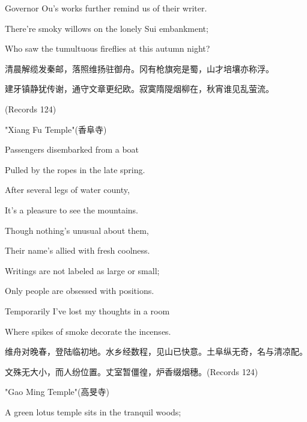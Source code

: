 \begin{BookQuote}
Governor Ou's works further remind us of their writer.
\end{BookQuote}

\begin{BookQuote}
There're smoky willows on the lonely Sui embankment;
\end{BookQuote}

\begin{BookQuote}
Who saw the tumultuous fireflies at this autumn night?
\end{BookQuote}

\begin{BookQuote}
清晨解缆发秦邮，落照维扬驻御舟。冈有枪旗宛是蜀，山才培壤亦称浮。
\end{BookQuote}

\begin{BookQuote}
建牙镇静犹传谢，通守文章更纪欧。寂寞隋隄烟柳在，秋宵谁见乱萤流。
\end{BookQuote}

(Records 124)

"Xiang Fu Temple"(香阜寺)

\begin{BookQuote}
Passengers disembarked from a boat
\end{BookQuote}

\begin{BookQuote}
Pulled by the ropes in the late spring.
\end{BookQuote}


\noindent After several legs of water county,

It's a pleasure to see the mountains.

Though nothing's unusual about them,

Their name's allied with fresh coolness.

Writings are not labeled as large or small;

Only people are obsessed with positions.

Temporarily I've lost my thoughts in a room

Where spikes of smoke decorate the incenses.

维舟对晚春，登陆临初地。水乡经数程，见山已快意。土阜纵无奇，名与清凉配。

文殊无大小，而人纷位置。丈室暂僵徨，炉香缀烟穗。(Records 124)

"Gao Ming Temple"(高旻寺)

A green lotus temple sits in the tranquil woods;

